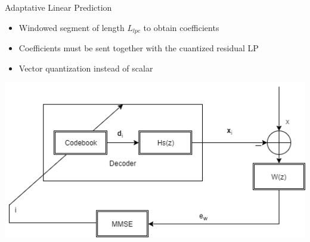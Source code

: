 \documentclass[10pt]{beamer}
\begin{document}
\begin{frame}{Adaptative Linear Prediction }
\begin{itemize}
  \item Windowed segment of length $L_{lpc}$ to obtain coefficients
  \item Coefficients must be sent together with the cuantized residual LP
  \item Vector quantization instead of scalar\footnotemark
\end{itemize}
\centering
\includegraphics[width=0.8\linewidth]{./img/Figure_1.png}
\end{frame}



\begingroup
{}
\end{document}
